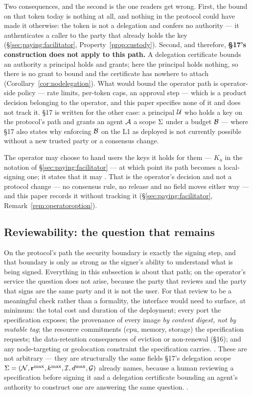 Two consequences, and the second is the one readers get wrong. First, the bound on that
token today is nothing at all, and nothing in the protocol could have made it otherwise:
the token is not a delegation and confers no authority — it authenticates a caller to the
party that already holds the key (\S\ref{sec:paying:facilitator},
Property~\ref{prop:custody}). Second, and therefore, \textbf{\S17's construction does not
apply to this path.} A delegation certificate bounds an authority a principal holds and
grants; here the principal holds nothing, so there is no grant to bound and the
certificate has nowhere to attach (Corollary~\ref{cor:nodelegation}). What would bound the
operator path is operator-side policy — rate limits, per-token caps, an approval step —
which is a product decision belonging to the operator, and this paper specifies none of it
and does not track it. \S17 is written for the other case: a principal \(\mathcal{U}\) who
holds a key on the protocol's path and grants an agent \(\mathcal{A}\) a scope \(\Sigma\)
under a budget \(\mathcal{B}\) — where \S17 also states why enforcing \(\mathcal{B}\) on the
\Flux L1 as deployed is not currently possible without a new trusted party or a consensus
change.

The operator may choose to hand users the keys it holds for them — \(K_u\) in the notation
of \S\ref{sec:paying:facilitator} — at which point its path becomes a local-signing one;
it states that it may
. That is the operator's decision and not a
protocol change — no consensus rule, no \FluxOS release and no \appspec field moves either
way — and this paper records it without tracking it
(\S\ref{sec:paying:facilitator}, Remark~\ref{rem:operatoroption}).

\subsection{Reviewability: the question that remains}

On the protocol's path the security boundary is exactly the signing step, and
that boundary is only as strong as the signer's ability to understand what is being
signed. Everything in this subsection is about that path; on the operator's service the
question does not arise, because the party that reviews and the party that signs are the
same party and it is not the user. For that review to be a meaningful check rather than a formality, the interface
would need to surface, at minimum: the total cost and duration of the deployment; every
port the specification exposes; the provenance of every image \emph{by content digest,
not by mutable tag}; the resource commitments (cpu, memory, storage) the specification
requests; the data-retention consequences of eviction or non-renewal (\S16); and any
node-targeting or geolocation constraint the specification carries. \planned. These are
not arbitrary — they are structurally the same fields \S17's delegation scope
\(\Sigma = (\mathcal{N}, \mathbf{r}^{\max}, k^{\max}, \mathcal{I}, d^{\max}, \mathcal{G})\)
already names, because a human reviewing a specification before signing it and a
delegation certificate bounding an agent's authority to construct one are answering the
same question. \planned {}.


